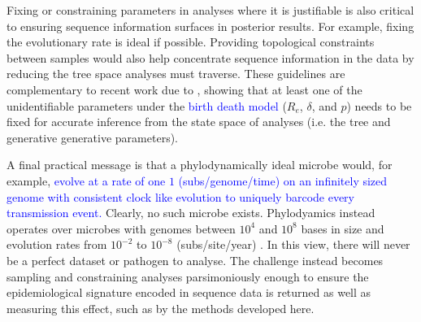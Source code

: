 \documentclass{article}
\begin{document}
Fixing or constraining parameters in analyses where it is justifiable is also critical to ensuring sequence information surfaces in posterior results. For example, fixing the evolutionary rate is ideal if possible. Providing topological constraints between samples would also help concentrate sequence information in the data by reducing the tree space analyses must traverse. These guidelines are complementary to recent work due to \citet{louca2021fundamental}, showing that at least one of the unidentifiable parameters under the \textcolor{blue}{birth death model} ($R_e$, $\delta$, and $p$) needs to be fixed for accurate inference from the state space  of analyses (i.e. the tree and generative generative parameters).

A final practical message is that a phylodynamically ideal microbe would, for example, \textcolor{blue}{evolve at a rate of one $1$ (subs/genome/time) on an infinitely sized genome with consistent clock like evolution to uniquely barcode every transmission event.} Clearly, no such microbe exists. Phylodyamics instead operates over microbes with genomes between $10^4$ and $10^8$ bases in size and evolution rates from $10^{-2}$ to $10^{-8}$ (subs/site/year) \citep{Biek2015Mesurably}. In this view, there will never be a perfect dataset or pathogen to analyse. The challenge instead becomes sampling and constraining analyses parsimoniously enough to ensure the epidemiological signature encoded in sequence data is returned as well as measuring this effect, such as by the methods developed here.
\end{document}
